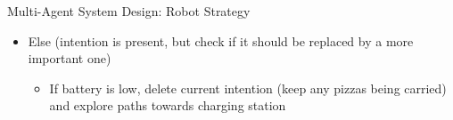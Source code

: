 \begin{frame}[allowframebreaks]{Multi-Agent System Design: Robot Strategy}
\begin{itemize}
\begin{itemize}
            \item Else (intention is present, but check if it should be replaced by a more important one)
            \begin{itemize}
                \item If battery is low, delete current intention (keep any pizzas being carried) and explore paths towards charging station
            \end{itemize}

        \end{itemize}
    \end{itemize}
\end{frame}

